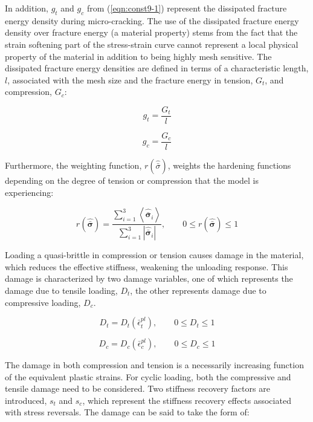 In addition, $g_t$ and $g_c$ from (\ref{eqn:const9-1}) represent the dissipated fracture energy density during micro-cracking. The use of the dissipated fracture energy density over fracture energy (a material property) stems from the fact that the strain softening part of the stress-strain curve cannot represent a local physical property of the material in addition to being highly mesh sensitive. The dissipated fracture energy densities are defined in terms of a characteristic length, $l$, associated with the mesh size and the fracture energy in tension, $G_t$, and compression, $G_c$: 

\begin{equation}
g_t = \frac{G_t}{l}
\label{eqn:dam1c}
\end{equation}

\begin{equation}
g_c = \frac{G_c}{l}
\label{eqn:dam1d}
\end{equation}

Furthermore, the weighting function, $r\left(\hat{\bar{\sigma}}\right)$, weights the hardening functions depending on the degree of tension or compression that the model is experiencing:

\begin{equation}
r\left(\hat{\boldsymbol{\bar{\sigma}}}\right)=\frac{\sum_{i=1}^{3}\left\langle \hat{\boldsymbol{\bar{\sigma}}}_{i}\right\rangle }{\sum_{i=1}^{3}\left|\hat{\boldsymbol{\bar{\sigma}}}_{i}\right|},\qquad0\leq r\left(\hat{\boldsymbol{\bar{\sigma}}}\right)\leq1
\label{eqn:const9-2}
\end{equation}

Loading a quasi-brittle in compression or tension causes damage in the material, which reduces the effective stiffness, weakening the unloading response. This damage is characterized by two damage variables, one of which represents the damage due to tensile loading, $D_{t}$, the other represents damage due to compressive loading, $D_{c}$. 

\begin{equation}
D_{t}=D_{t}\left(\bar{\epsilon}_{t}^{pl}\right),\qquad0\leq D_{t}\leq1
\label{eqn:dam2a}
\end{equation}

\begin{equation}
D_{c}=D_{c}\left(\bar{\epsilon}_{c}^{pl}\right),\qquad0\leq D_{c}\leq1
\label{eqn:dam2b}
\end{equation}

The damage in both compression and tension is a necessarily increasing
function of the equivalent plastic strains. For cyclic loading, both the compressive and tensile damage need to be considered. Two stiffness recovery factors are introduced, $s_{t}$ and $s_{c}$, which represent the stiffness recovery effects associated with stress reversals. The damage can be said to take the form of:

